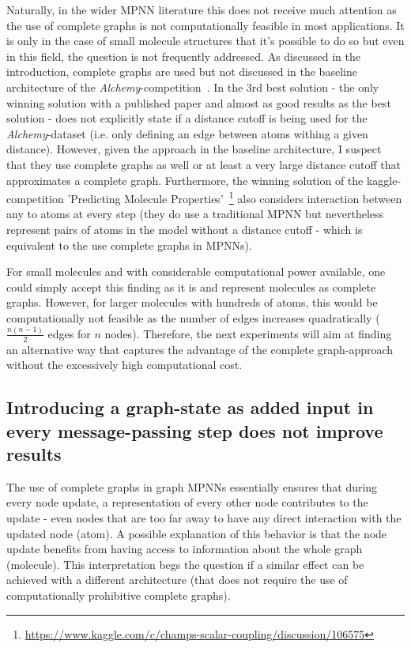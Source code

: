 Naturally, in the wider MPNN literature this does not receive much attention as the use of complete graphs is not computationally feasible in most applications. It is only in the case of small molecule structures that it's possible to do so but even in this field, the question is not frequently addressed. As discussed in the introduction, complete graphs are used but not discussed in the baseline architecture of the \textit{Alchemy}-competition~\cite{Chen2019}. In the 3rd best solution - the only winning solution with a published paper and almost as good results as the best solution - does not explicitly state if a distance cutoff is being used for the \textit{Alchemy}-dataset (i.e. only defining an edge between atoms withing a given distance). However, given the approach in the baseline architecture, I suspect that they use complete graphs as well or at least a very large distance cutoff that approximates a complete graph. Furthermore, the winning solution of the kaggle-competition 'Predicting Molecule Properties'~\footnote{\url{https://www.kaggle.com/c/champs-scalar-coupling/discussion/106575}} also considers interaction between any to atoms at every step (they do use a traditional MPNN but nevertheless represent pairs of atoms in the model without a distance cutoff - which is equivalent to the use complete graphs in MPNNs).

For small molecules and with considerable computational power available, one could simply accept this finding as it is and represent molecules as complete graphs. However, for larger molecules with hundreds of atoms, this would be computationally not feasible as the number of edges increases quadratically ($\frac{n(n - 1)}{2}$ edges for $n$ nodes). Therefore, the next experiments will aim at finding an alternative way that captures the advantage of the complete graph-approach without the excessively high computational cost.





\subsection{Introducing a graph-state as added input in every message-passing step does not improve results}
\label{sec:root-node}


The use of complete graphs in graph MPNNs essentially ensures that during every node update, a representation of every other node contributes to the update - even nodes that are too far away to have any direct interaction with the updated node (atom).
A possible explanation of this behavior is that the node update benefits from having access to information about the whole graph (molecule). This interpretation begs the question if a similar effect can be achieved with a different architecture (that does not require the use of computationally prohibitive complete graphs).

